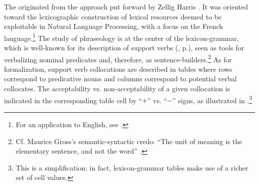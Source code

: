 The  \parencite{GrossM1988b,GrossM1994b} originated from the  approach put forward by Zellig Harris \parencite{Harris1954,Sahlgren2008}. It was oriented toward the lexicographic construction of lexical resources deemed to be exploitable in Natural Language Processing, with a focus on the French language.\footnote{For an application to English, see \textcite{Garcia-VegaMachonis2014}.} The study of phraseology is at the center of the lexicon-grammar, which is well-known for its description of support verbs (, p.\thinspace\pageref{sec:verbeSupport}), seen as tools for verbalizing nominal predicates and, therefore, as sentence-builders.\footnote{Cf. Maurice Gross's semantic-syntactic credo: ``The unit of meaning is the elementary sentence, and not the word'' \parencite[182]{GrossM1988b}.} As for formalization, support verb collocations are described in tables where rows correspond to predicative nouns and columns correspond to potential verbal collocates. The acceptability vs. non-acceptability of a given collocation is indicated in the corresponding table cell by ``$+$'' vs. ``$-$'' signs, as illustrated in .\footnote{This is a simplification; in fact, lexicon-grammar tables make use of a richer set of cell values.}

